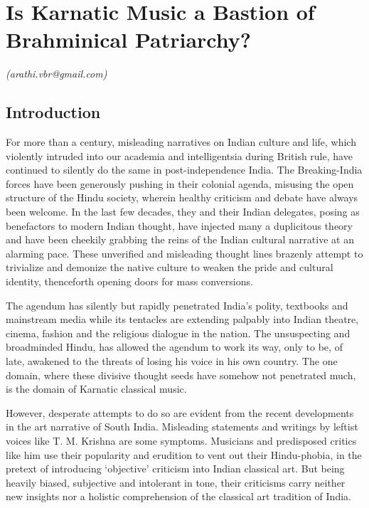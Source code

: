
\chapter{Is Karnatic Music a Bastion of Brahminical Patriarchy?}\label{chapter7}


\vspace{-.3cm}


\begin{flushright}
\textit{(arathi.vbr@gmail.com)}
\end{flushright}


\section*{Introduction}

For more than a century, misleading narratives on Indian culture and life, which violently intruded into our academia and intelligentsia during British rule, have continued to silently do the same in post-independence India. The Breaking-India forces have been generously pushing in their colonial agenda, misusing the open structure of the Hindu society, wherein healthy criticism and debate have always been welcome. In the last few decades, they and their Indian delegates, posing as benefactors to modern Indian thought, have injected many a duplicitous theory and have been cheekily grabbing the reins of the Indian cultural narrative at an alarming pace. These unverified and misleading thought lines brazenly attempt to trivialize and demonize the native culture to weaken the pride and cultural identity, thenceforth opening doors for mass conversions.

The agendum has silently but rapidly penetrated India’s polity, textbooks and mainstream media while its tentacles are extending palpably into Indian theatre, cinema, fashion and the religious dialogue in the nation. The unsuspecting and broadminded Hindu, has allowed the agendum to work its way, only to be, of late, awakened to the threats of losing his voice in his own country. The one domain, where these divisive thought seeds have somehow not penetrated much, is the domain of Karnatic classical music.

However, desperate attempts to do so are evident from the recent developments in the art narrative of South India. Misleading statements and writings by leftist voices like T. M. Krishna are some symptoms. Musicians and predisposed critics like him use their popularity and erudition to vent out their Hindu-phobia, in the pretext of introducing ‘objective’ criticism into Indian classical art. But being heavily biased, subjective and intolerant in tone, their criticisms carry neither new insights nor a holistic comprehension of the classical art tradition of India.

